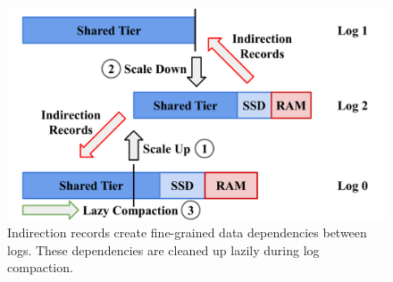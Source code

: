 \begin{figure}[t]
\centering
\includegraphics[width=\columnwidth]{figures/indirection.pdf}
\caption{Indirection records create fine-grained data dependencies
    between logs. These dependencies are cleaned up lazily during
    log compaction.
}
\label{fig:dfs}
\end{figure}
